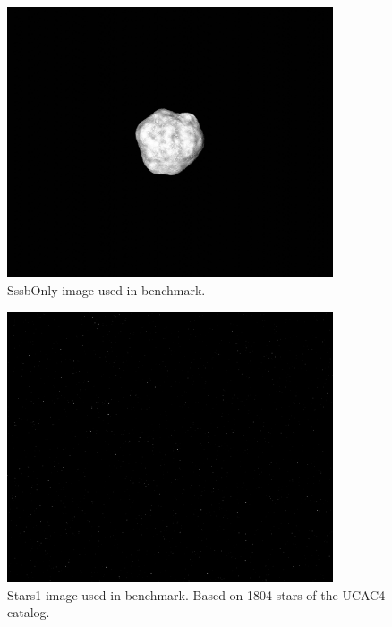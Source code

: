 \begin{figure}[htb]
    \begin{center}
        \includegraphics[height=8cm]{doc/thesis/0_figures/cv_skimage/SssbOnly_2017-08-15T115851-679000.jpg}
    \end{center}
    \caption{SssbOnly image used in benchmark.}
    \label{fig:bm_sssbonly}
\end{figure}

\begin{figure}[htb]
    \begin{center}
        \includegraphics[height=8cm]{doc/thesis/0_figures/cv_skimage/Stars_2017-08-15T115841-334000.png}
    \end{center}
    \caption{Stars1 image used in benchmark. Based on 1804 stars of the UCAC4 catalog.}
    \label{fig:bm_stars1}
\end{figure}

